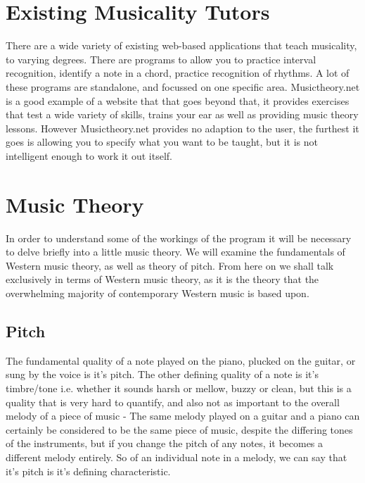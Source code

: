 	\section{Existing Musicality Tutors}
	
	There are a wide variety of existing web-based applications that teach musicality, to varying degrees. There are programs to allow you to practice interval recognition\cite{intervalEarTrainer}, identify a note in a chord, practice recognition of rhythms\cite{rhythmTrainer}. A lot of these programs are standalone, and focussed on one specific area. Musictheory.net\cite{musicTheorynet} is a good example of a website that that goes beyond that, it provides exercises that test a wide variety of skills, trains your ear as well as providing music theory lessons. However Musictheory.net provides no adaption to the user, the furthest it goes is allowing you to specify what you want to be taught, but it is not intelligent enough to work it out itself.
	\section{Music Theory}
	In order to understand some of the workings of the program it will be necessary to delve briefly into a little music theory. We will examine the fundamentals of Western music theory, as well as theory of pitch. From here on we shall talk exclusively in terms of Western music theory, as it is the theory that the overwhelming majority of contemporary Western music is based upon.
	

	\subsection{Pitch}
	\par The fundamental quality of a note played on the piano, plucked on the guitar, or sung by the voice is it's pitch. The other defining quality of a note is it's timbre/tone i.e. whether it sounds harsh or mellow, buzzy or clean, but this is a quality that is very hard to quantify, and also not as important to the overall melody of a piece of music - The same melody played on a guitar and a piano can certainly be considered to be the same piece of music, despite the differing tones of the instruments, but if you change the pitch of any notes, it becomes a different melody entirely. So of an individual note in a melody, we can say that it's pitch is it's defining characteristic.
	
